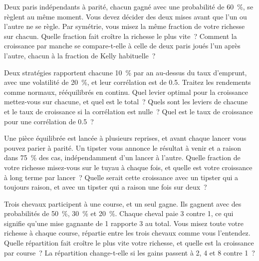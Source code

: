 \begin{question}\label{iq:iv2:betting-and-kelly:13}
Deux paris indépendants à parité, chacun gagné avec une probabilité de 60~\%, se règlent au même moment. Vous devez décider des deux mises avant que l'un ou l'autre ne se règle. Par symétrie, vous misez la même fraction de votre richesse sur chacun. Quelle fraction fait croître la richesse le plus vite~? Comment la croissance par manche se compare-t-elle à celle de deux paris joués l'un après l'autre, chacun à la fraction de Kelly habituelle~?
\end{question}

\begin{question}\label{iq:iv2:betting-and-kelly:14}
Deux stratégies rapportent chacune 10~\% par an au-dessus du taux d'emprunt, avec une volatilité de 20~\%, et leur corrélation est de 0.5. Traitez les rendements comme normaux, rééquilibrés en continu. Quel levier optimal pour la croissance mettez-vous sur chacune, et quel est le total~? Quels sont les leviers de chacune et le taux de croissance si la corrélation est nulle~? Quel est le taux de croissance pour une corrélation de 0.5~?
\end{question}

\begin{question}\label{iq:iv2:betting-and-kelly:15}
Une pièce équilibrée est lancée à plusieurs reprises, et avant chaque lancer vous pouvez parier à parité. Un tipster vous annonce le résultat à venir et a raison dans 75~\% des cas, indépendamment d'un lancer à l'autre. Quelle fraction de votre richesse misez-vous sur le tuyau à chaque fois, et quelle est votre croissance à long terme par lancer~? Quelle serait cette croissance avec un tipster qui a toujours raison, et avec un tipster qui a raison une fois sur deux~?
\end{question}

\begin{question}\label{iq:iv2:betting-and-kelly:16}
Trois chevaux participent à une course, et un seul gagne. Ils gagnent avec des probabilités de 50~\%, 30~\% et 20~\%. Chaque cheval paie 3 contre 1, ce qui signifie qu'une mise gagnante de 1 rapporte 3 au total. Vous misez toute votre richesse à chaque course, répartie entre les trois chevaux comme vous l'entendez. Quelle répartition fait croître le plus vite votre richesse, et quelle est la croissance par course~? La répartition change-t-elle si les gains passent à 2, 4 et 8 contre 1~?
\end{question}


